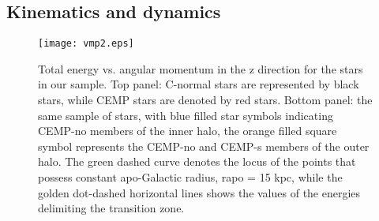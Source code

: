 \subsection{Kinematics and dynamics} \label{sec:kinematics}




\begin{figure}[!ht]
\begin{center}
\texttt{[image: vmp2.eps]}\end{center}
\caption{Total energy vs. angular momentum in the z direction for the stars in our sample. Top panel: C-normal stars are represented by black
stars, while CEMP stars are denoted by red stars. Bottom panel: the same sample of stars, with blue filled star symbols indicating CEMP-no members of the inner halo, the orange filled square symbol represents the CEMP-no and CEMP-s members of
the outer halo. The green dashed curve denotes
the locus of the points that possess constant apo-Galactic radius, rapo = 15 kpc, while the golden dot-dashed horizontal lines shows the values of the energies delimiting the transition zone.}
\label{fig:apo_peri}
\end{figure}

